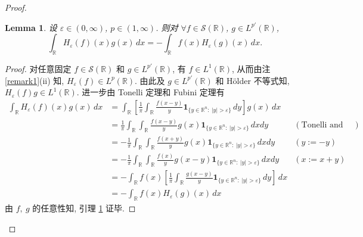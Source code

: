 \documentclass[a4paper,11pt]{article}
\newtheorem{lemma}[theorem]{Lemma}
\theoremstyle{definition}
\begin{document}
\begin{CJK*}{UTF8}{gbsn}
\begin{proof}
\begin{lemma} \label{lem3}
    设 $ \varepsilon \in (0, \infty) $, $ p \in (1, \infty) $. 
    则对 $ \forall f \in \mathcal{S}(\mathbb{R}) $, $ g \in L^{p'}(\mathbb{R}) $,
    $$
        \int_\mathbb{R} H_\varepsilon (f)(x) g(x) \, dx
            = -\int_\mathbb{R} f(x) H_\varepsilon (g)(x) \, dx.
    $$
\end{lemma}

\begin{proof}
    对任意固定 $ f \in \mathcal{S}(\mathbb{R}) $ 和 $ g \in L^{p'}(\mathbb{R}) $, 有 $ f \in L^1(\mathbb{R}) $, 
    从而由注 \ref{remark1}(ii) 知, $ H_\varepsilon (f) \in L^p(\mathbb{R}) $. 
    由此及 $ g \in L^{p'}(\mathbb{R}) $ 和 H\"older 不等式知, $ H_\varepsilon (f) g \in L^1(\mathbb{R}) $.
    进一步由 Tonelli 定理和 Fubini 定理有
    \begin{align*} 
        \int_\mathbb{R} H_\varepsilon (f)(x) g(x) \, dx
            &= \int_\mathbb{R} \left[ \frac{1}{\pi} \int_\mathbb{R} \frac{f(x - y)}{y} 
                \mathbf{1}_{\{y \in \mathbb{R}^n :\ |y| > \varepsilon\}} \, dy \right] g(x) \, dx \\
            &= \frac{1}{\pi} \int_\mathbb{R} \int_\mathbb{R}
                \frac{f(x - y)}{y} g(x) \mathbf{1}_{\{y \in \mathbb{R}^n :\ |y| > \varepsilon\}} \, dx dy  
                & (\text{Tonelli and Fubini}) \\
            &= -\frac{1}{\pi} \int_\mathbb{R} \int_\mathbb{R}
                \frac{f(x + y)}{y} g(x) \mathbf{1}_{\{y \in \mathbb{R}^n :\ |y| > \varepsilon\}} \, dx dy  
                & (y := -y) \\
            &= -\frac{1}{\pi} \int_\mathbb{R} \int_\mathbb{R}
                \frac{f(x)}{y} g(x - y) \mathbf{1}_{\{y \in \mathbb{R}^n :\ |y| > \varepsilon\}} \, dx dy  
                & (x := x + y) \\
            &= - \int_\mathbb{R} f(x) \left[ \frac{1}{\pi} \int_\mathbb{R}
                \frac{g(x - y)}{y} \mathbf{1}_{\{y \in \mathbb{R}^n :\ |y| > \varepsilon\}} \, dy  \right] \, dx \\
            &= - \int_\mathbb{R} f(x) H_\varepsilon (g)(x) \, dx
    \end{align*}
    由 $ f,\ g $ 的任意性知, 引理 \ref{lem3} 证毕.
\end{proof}
    

\end{proof}
\end{CJK*}
\end{document}
